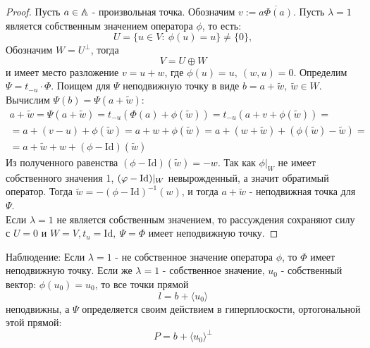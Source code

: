 \begin{proof}
    Пусть $a\in \A$ - произвольная точка. Обозначим $v:=\overline{a\Phi(a)}$. Пусть $\lambda=1$ является собственным значением оператора $\phi$, то есть:
    \[U=\{u\in V:\ \phi(u)=u\}\ne \{0\},\]
    Обозначим $W=U^{\perp}$, тогда
    \[V=U\oplus W\]
    и имеет место разложение $v=u+w$, где $\phi(u)=u,\ (w,u)=0$. Определим $\Psi=t_{-u}\cdot \Phi$. Поищем для $\Psi$ неподвижную точку в виде $b=a+\widetilde{w},\ \widetilde{w}\in W$. Вычислим $\Psi(b) = \Psi(a+\widetilde{w})$:
    \begin{multline*}
        a+\widetilde{w} = \Psi(a+\widetilde{w})=t_{-u}(\Phi(a)+\phi(\widetilde{w}))=t_{-u}(a+v+\phi(\widetilde{w}))=\\
        =a+(v-u)+\phi(\widetilde{w})=a+w+\phi(\widetilde{w})=a+(w+\widetilde{w})+(\phi(\widetilde{w})-\widetilde{w})=\\
        =a+\widetilde{w}+w+(\phi-\text{Id})(\widetilde{w})
    \end{multline*}
    Из полученного равенства $(\phi-\text{Id})(\widetilde{w}) = -w$. Так как $\phi|_W$ не имеет собственного значения 1, $(\phi - \textup{Id})|_W$ невырожденный, а значит обратимый оператор. Тогда $\widetilde{w} = -(\phi-\text{Id})^{-1}(w)$, и тогда $a + \widetilde{w}$ - неподвижная точка для $\Psi$.\\
    Если $\lambda=1$ не является собственным значением, то рассуждения сохраняют силу с $U=0$ и $W=V, t_u=\text{Id},\ \Psi=\Phi$ имеет неподвижную точку.
\end{proof}
Наблюдение: Если $\lambda=1$ - не собственное значение оператора $\phi$, то $\Phi$ имеет неподвижную точку. Если же $\lambda =1$ - собственное значение, $u_0$ - собственный вектор: $\phi(u_0)=u_0$, то все точки прямой
\[l=b+\langle u_0 \rangle\] 
неподвижны, а $\Psi$ определяется своим действием в гиперплоскости, ортогональной этой прямой:
\[P=b+\langle u_0 \rangle^{\perp}\]
